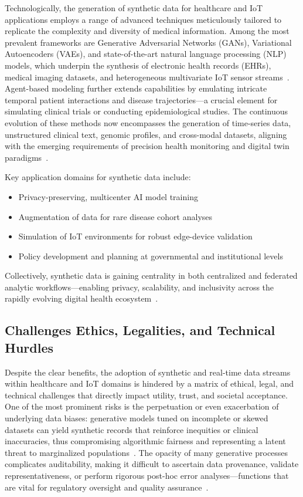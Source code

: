 Technologically, the generation of synthetic data for healthcare and IoT applications employs a range of advanced techniques meticulously tailored to replicate the complexity and diversity of medical information. Among the most prevalent frameworks are Generative Adversarial Networks (GANs), Variational Autoencoders (VAEs), and state-of-the-art natural language processing (NLP) models, which underpin the synthesis of electronic health records (EHRs), medical imaging datasets, and heterogeneous multivariate IoT sensor streams~\cite{ref91}. Agent-based modeling further extends capabilities by emulating intricate temporal patient interactions and disease trajectories—a crucial element for simulating clinical trials or conducting epidemiological studies. The continuous evolution of these methods now encompasses the generation of time-series data, unstructured clinical text, genomic profiles, and cross-modal datasets, aligning with the emerging requirements of precision health monitoring and digital twin paradigms~\cite{ref91,ref106}.

Key application domains for synthetic data include:

\begin{itemize}
    \item Privacy-preserving, multicenter AI model training
    \item Augmentation of data for rare disease cohort analyses
    \item Simulation of IoT environments for robust edge-device validation
    \item Policy development and planning at governmental and institutional levels
\end{itemize}

Collectively, synthetic data is gaining centrality in both centralized and federated analytic workflows—enabling privacy, scalability, and inclusivity across the rapidly evolving digital health ecosystem~\cite{ref91,ref106}.

\subsection{Challenges Ethics, Legalities, and Technical Hurdles}

Despite the clear benefits, the adoption of synthetic and real-time data streams within healthcare and IoT domains is hindered by a matrix of ethical, legal, and technical challenges that directly impact utility, trust, and societal acceptance. One of the most prominent risks is the perpetuation or even exacerbation of underlying data biases: generative models tuned on incomplete or skewed datasets can yield synthetic records that reinforce inequities or clinical inaccuracies, thus compromising algorithmic fairness and representing a latent threat to marginalized populations~\cite{ref91}. The opacity of many generative processes complicates auditability, making it difficult to ascertain data provenance, validate representativeness, or perform rigorous post-hoc error analyses—functions that are vital for regulatory oversight and quality assurance~\cite{ref106}.

